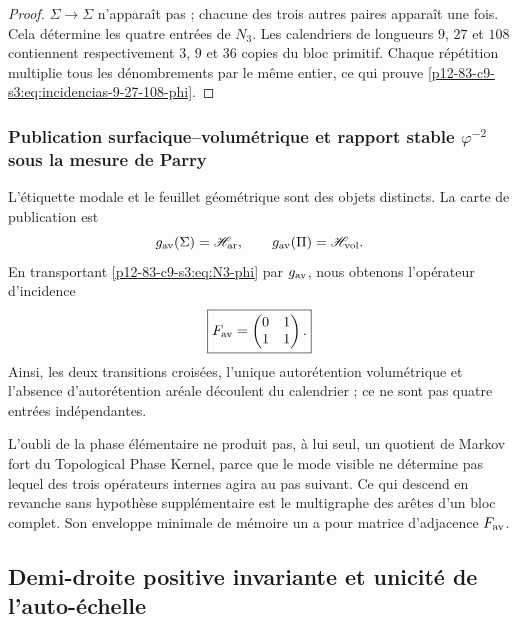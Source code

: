 \begin{proof}
\(\Sigma\to\Sigma\) n’apparaît pas ; chacune des trois autres paires apparaît
une fois. Cela détermine les quatre entrées de \(N_3\). Les calendriers de
longueurs \(9\), \(27\) et \(108\) contiennent respectivement \(3\), \(9\)
et \(36\) copies du bloc primitif. Chaque répétition multiplie tous les
dénombrements par le même entier, ce qui prouve
\eqref{p12-83-c9-s3:eq:incidencias-9-27-108-phi}.
\end{proof}

\subsubsection{Publication surfacique–volumétrique et rapport stable \(\varphi^{-2}\) sous la mesure de Parry}

L’étiquette modale et le feuillet géométrique sont des objets distincts. La carte
de publication est
\[
 \mathfrak g_{\rm av}(\Sigma)=\mathscr H_{\rm ar},
 \qquad
 \mathfrak g_{\rm av}(\Pi)=\mathscr H_{\rm vol}.
\]
En transportant \eqref{p12-83-c9-s3:eq:N3-phi} par \(\mathfrak g_{\rm av}\), nous obtenons
l’opérateur d’incidence
\begin{equation}
 \boxed{
 F_{\rm av}=
 \begin{pmatrix}
 0&1\\
 1&1
 \end{pmatrix}.}
 \label{p12-83-c9-s3:eq:Fav-derivada-phi}
\end{equation}
Ainsi, les deux transitions croisées, l’unique autorétention volumétrique et
l’absence d’autorétention aréale découlent du calendrier ; ce ne sont pas quatre
entrées indépendantes.

\begin{remark}
L’oubli de la phase élémentaire ne produit pas, à lui seul, un quotient de Markov
fort du Topological Phase Kernel, parce que le mode visible ne détermine pas
lequel des trois opérateurs internes agira au pas suivant. Ce qui
descend en revanche sans hypothèse supplémentaire est le multigraphe des arêtes d’un
bloc complet. Son enveloppe minimale de mémoire un a pour matrice
d’adjacence \(F_{\rm av}\).
\end{remark}

\subsection{Demi-droite positive invariante et unicité de l’auto-échelle}

